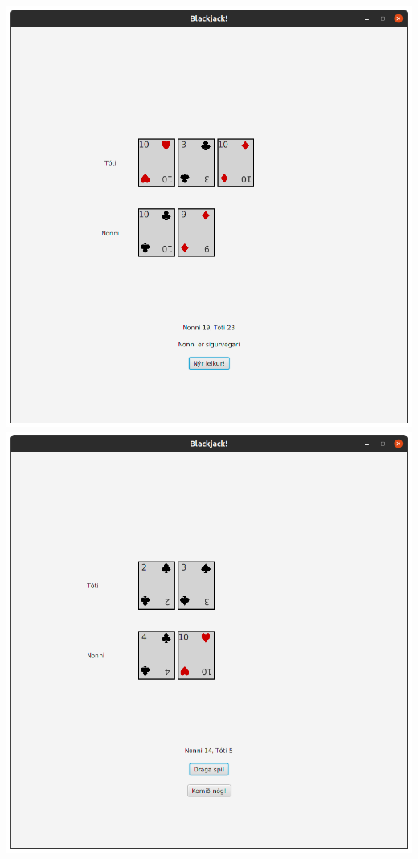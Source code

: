 \documentclass{article}
\begin{document}
\begin{center}
    \includegraphics[scale=0.17]{bj3.png}
    \includegraphics[scale=0.17]{bj4.png}

\end{center}
\end{document}
